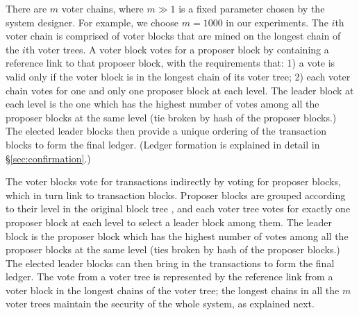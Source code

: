 
There are $m$ voter chains, where $m \gg 1$ is a fixed parameter chosen by the system designer. For example, we choose $m=1000$ in our experiments.  The $i$th voter chain is comprised of voter blocks that are mined on the longest chain of the $i$th voter trees. A voter block votes for a proposer block by containing a reference link to that proposer block, with the requirements that: 1) a vote is valid only if the voter block is in the longest chain of its voter tree; 2) each voter chain votes for one and only one proposer block at each level. The leader block at each level is the one which has the highest number of votes among all the proposer blocks at the same level (tie broken by hash of the proposer blocks.) The elected leader blocks then provide a unique ordering of the transaction blocks to form the final ledger. (Ledger formation is explained in detail in \S\ref{sec:confirmation}.)







The voter blocks vote for transactions indirectly by voting for proposer blocks, which in turn link to transaction blocks. Proposer blocks are grouped according to their level in the original block tree , and each voter tree votes for exactly one proposer block at each level to select a leader block among them. The leader block is the proposer block which has the highest number of votes among all the proposer blocks at the same level (ties broken by hash of the proposer blocks.) The elected leader blocks can then bring in the transactions to form the final ledger.  The vote from a voter tree is represented by the reference link from a voter block in the longest chains of the voter tree; the longest chains in all the $m$ voter trees maintain the security of the whole system, as explained next.

